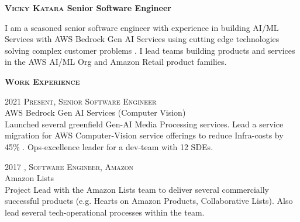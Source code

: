 \documentclass[letterpaper,12pt,final]{memoir}
\newcommand{\Sep}{\vspace{1.5em}}
\newcommand{\SmallSep}{\vspace{0.5em}}
\newenvironment{Objective}
	{\ignorespaces\textbf{\color{Plum} Objective}}
	{\Sep\ignorespacesafterend}
\newcommand{\CVSection}[1]
	{\Large\textbf{\textsc{{#1}}}\par
	\SmallSep\normalsize\normalfont}
\newcommand{\CVItem}[1]
	{\textsc{\color{Plum} #1}}
\begin{document}
\Huge\bfseries \textsc{\color{Plum} Vicky Katara}
{\normalsize \bfseries  Senior Software Engineer }
\SmallSep

\normalsize\normalfont

\begin{footnotesize}
I am a seasoned senior software engineer with experience in building AI/ML Services with AWS Bedrock Gen AI Services using cutting edge technologies solving complex customer problems . I lead teams building products and services in the AWS  AI/ML Org and Amazon Retail product families.
\end{footnotesize}

\CVSection{Work Experience}

\CVItem{2021 \textendash \space Present, Senior Software Engineer}\\
\SmallSep
AWS Bedrock Gen AI Services (Computer Vision) \\
{\footnotesize Launched several greenfield Gen-AI Media Processing services. Lead a service migration for AWS Computer-Vision service offerings to reduce Infra-costs by 45\% . Ops-excellence leader for a dev-team with 12 SDEs.\\}

\CVItem{2017 \textendash {}, Software Engineer, Amazon}\\
\SmallSep
Amazon Lists\\
{\footnotesize Project Lead with the Amazon Lists team to deliver several commercially successful products (e.g. Hearts on Amazon Products, Collaborative Lists). Also lead several tech-operational processes within the team.}
\end{document}

